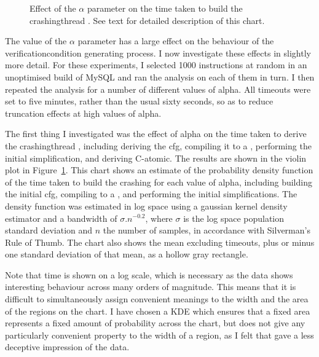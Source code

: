 
\begin{figure}
  \centerline{}
  \caption{Effect of the $\alpha$ parameter on the time taken to build
    the \gls{crashingthread} {\StateMachines}.  See text for detailed
    description of this chart.}
  \label{fig:perf:alpha:bpm:unopt}
\end{figure}

The value of the $\alpha$ parameter has a large effect on the
behaviour of the \gls{verificationcondition} generating process.  I
now investigate these effects in slightly more detail.  For these
experiments, I selected 1000 instructions at random in an unoptimised
build of MySQL and ran the analysis on each of them in turn.  I then
repeated the analysis for a number of different values of \gls{alpha}.
All timeouts were set to five minutes, rather than the usual sixty
seconds, so as to reduce truncation effects at high values of
\gls{alpha}.

The first thing I investigated was the effect of \gls{alpha} on the
time taken to derive the \gls{crashingthread} {\StateMachines},
including deriving the \gls{cfg}, compiling it to a {\StateMachine},
performing the initial simplification, and deriving C-atomic.  The
results are shown in the violin plot in
Figure~\ref{fig:perf:alpha:bpm:unopt}.  This chart shows an estimate
of the probability density function of the time taken to build the
crashing {\StateMachines} for each value of \gls{alpha}, including
building the initial \gls{cfg}, compiling to a {\StateMachine}, and
performing the initial simplifications.  The density function was
estimated in log space using a gaussian kernel density estimator and a
bandwidth of $\sigma.n^{-0.2}$, where $\sigma$ is the log space
population standard deviation and $n$ the number of samples, in
accordance with Silverman's Rule of Thumb\needCite{}.  The chart also
shows the mean excluding timeouts, plus or minus one standard
deviation of that mean, as a hollow gray rectangle.

Note that time is shown on a log scale, which is necessary as the data
shows interesting behaviour across many orders of magnitude.  This
means that it is difficult to simultaneously assign convenient
meanings to the width and the area of the regions on the chart.  I
have chosen a KDE which ensures that a fixed area represents a fixed
amount of probability across the chart, but does not give any
particularly convenient property to the width of a region, as I felt
that gave a less deceptive impression of the data.

